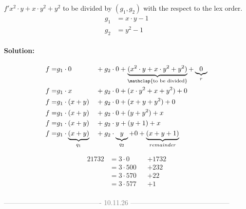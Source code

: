 \begin{example}[title = Example 2.2.1]
        $f 'x^2 \cdot y + x \cdot y^2 + y^2$ to be divided by $(g_1, g_2)$ with the respect to the lex order. 
        \begin{align*}
            g_1 & = x \cdot y -1 \\ 
            g_2 & = y^2 -1
        \end{align*}

    \paragraph{Solution:}
    \begin{alignat*}{2}
        f = &g_1 \cdot 0 && + g_2 \cdot 0 + \underbrace{(x^2 \cdot y + x \cdot y^2 + y^2)}_{\mathclap{\text{to be divided}}} + \underbrace{0}_{r} \\ 
        f = &g_1 \cdot x && + g_2 \cdot 0 + (x \cdot y^2 + x + y^2) + 0 \\
        f = &g_1 \cdot (x + y) && + g_2 \cdot 0 + (x + y + y^2) + 0 \\ 
        f = &g_1 \cdot (x + y) && + g_2 \cdot 0 + (y + y^2) + x \\
        f = &g_1 \cdot (x + y) && + g_2 \cdot y + (y + 1) + x \\
        f = &g_1 \cdot \underbrace{(x + y)}_{q_1} && + g_2 \cdot \underbrace{y}_{q_2} + 0 + \underbrace{(x + y + 1)}_{remainder}
    \end{alignat*}
\end{example}

\begin{example}[title = Example from School]
    \begin{alignat*}{2}
        1732 & = 3 \cdot 0 &&+ 1732 \\ 
             & = 3 \cdot 500 && + 232 \\ 
             & = 3 \cdot 570 && + 22 \\
             & = 3 \cdot 577 && + 1 \\ 
    \end{alignat*}
\end{example} 

\clearpage 

\begin{center}
  \textcolor{gray}{------------------------------------------- 10.11.26 --------------------------------------------} \\[0.3em]
\end{center}
\vspace{0.3em} 

